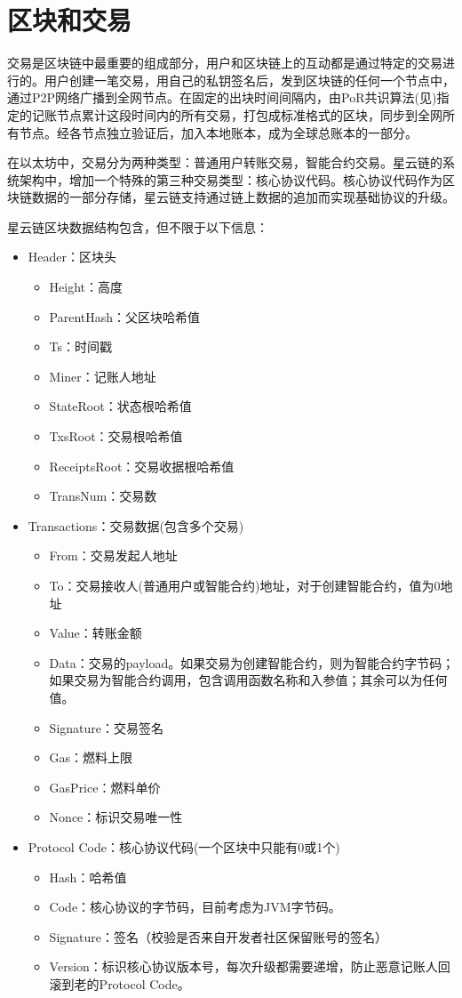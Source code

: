 \section{区块和交易}

交易是区块链中最重要的组成部分，用户和区块链上的互动都是通过特定的交易进行的。用户创建一笔交易，用自己的私钥签名后，发到区块链的任何一个节点中，通过P2P网络广播到全网节点。在固定的出块时间间隔内，由PoR共识算法(见)指定的记账节点累计这段时间内的所有交易，打包成标准格式的区块，同步到全网所有节点。经各节点独立验证后，加入本地账本，成为全球总账本的一部分。

在以太坊中，交易分为两种类型：普通用户转账交易，智能合约交易。星云链的系统架构中，增加一个特殊的第三种交易类型：核心协议代码。核心协议代码作为区块链数据的一部分存储，星云链支持通过链上数据的追加而实现基础协议的升级。

星云链区块数据结构包含，但不限于以下信息：
\begin{itemize}
	\item Header：区块头
		\begin{itemize}
		\item Height：高度
		\item ParentHash：父区块哈希值
		\item Ts：时间戳
		\item Miner：记账人地址
		\item StateRoot：状态根哈希值
		\item TxsRoot：交易根哈希值
		\item ReceiptsRoot：交易收据根哈希值
		\item TransNum：交易数
		\end{itemize}
	\item Transactions：交易数据(包含多个交易)
		\begin{itemize}
		\item From：交易发起人地址
		\item To：交易接收人(普通用户或智能合约)地址，对于创建智能合约，值为0地址
		\item Value：转账金额
		\item Data：交易的payload。如果交易为创建智能合约，则为智能合约字节码；如果交易为智能合约调用，包含调用函数名称和入参值；其余可以为任何值。
		\item Signature：交易签名
		\item Gas：燃料上限
		\item GasPrice：燃料单价
		\item Nonce：标识交易唯一性
		\end{itemize}
	\item Protocol Code：核心协议代码(一个区块中只能有0或1个)
		\begin{itemize}
		\item Hash：哈希值
		\item Code：核心协议的字节码，目前考虑为JVM字节码。
		\item Signature：签名（校验是否来自开发者社区保留账号的签名）
		\item Version：标识核心协议版本号，每次升级都需要递增，防止恶意记账人回滚到老的Protocol Code。
		\end{itemize}
\end{itemize}

